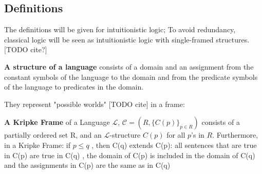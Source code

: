 \documentclass[runningheads]{llncs}
\begin{document}
\subsection{Definitions}
The definitions will be given for intuitionistic logic;  To avoid redundancy, classical logic will be seen as intuitionistic logic with single-framed structures. [TODO cite?]

\begin{definition}


    \textbf{A structure of a language} consists of a domain and an assignment from the constant symbols of the language to the domain and from  the predicate symbols of the language to predicates in the  domain. 
\end{definition}
 They represent "possible worlds" [TODO cite] in a frame: 
\begin{definition}

\textbf{ A Kripke Frame} of a Language \(\mathcal{L}\),   \(\mathcal{C} = (R, \{C(p)\}_{p \in R})\) consists of a partially ordered set R, and an \(\mathcal{L}\)-structure \(C(p)\) for all \(p\)'s in \(R\). Furthermore, in a Kripke Frame:
  if $p \leq q$ , then C(q) extends C(p):  all sentences that are true in C(p) are true in C(q) , the domain of C(p) is included in the domain of C(q) and the assignments in C(p) are the same as in C(q)

\end{definition}
\end{document}

